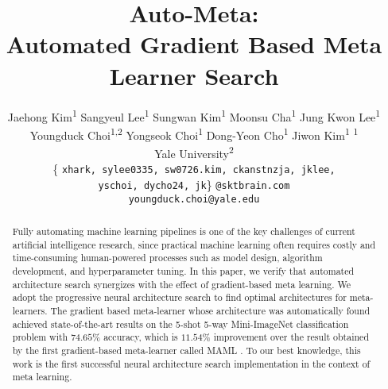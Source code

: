 \documentclass{article}
\title{Auto-Meta: \\
Automated Gradient Based Meta Learner Search}
\author{
  Jaehong Kim\textsuperscript{1}
  \And
  Sangyeul Lee\textsuperscript{1}
  \And
  Sungwan Kim\textsuperscript{1}
  \And
  Moonsu Cha\textsuperscript{1}
  \And
  Jung Kwon Lee\textsuperscript{1}
  \AND
  Youngduck Choi\textsuperscript{1,2}
  \And
  Yongseok Choi\textsuperscript{1}
  \And
  Dong-Yeon Cho\textsuperscript{1}
  \And
  Jiwon Kim\textsuperscript{1} 
  \AND
  \normalfont{SK T-Brain}\textsuperscript{1} \\
  Yale University\textsuperscript{2} \\
  \{ \texttt{xhark, sylee0335, sw0726.kim, ckanstnzja, jklee,} \\ 
  \texttt{yschoi, dycho24, jk}\} \texttt{@sktbrain.com} \\
  \texttt{youngduck.choi@yale.edu}
}
\begin{document}

\maketitle
\begin{abstract}
Fully automating machine learning pipelines is one of the key challenges of current artificial intelligence research, since practical machine learning often requires costly and time-consuming human-powered processes such as model design, algorithm development, and hyperparameter tuning. In this paper, we verify that automated architecture search synergizes with the effect of gradient-based meta learning. We adopt the progressive neural architecture search \cite{liu:pnas_google:DBLP:journals/corr/abs-1712-00559} to find optimal architectures for meta-learners. 
The gradient based meta-learner whose architecture was automatically found achieved state-of-the-art results on the 5-shot 5-way Mini-ImageNet classification problem with $74.65\%$ accuracy, which is $11.54\%$ improvement over the result obtained by the first gradient-based meta-learner called MAML \cite{finn:maml:DBLP:conf/icml/FinnAL17}.
To our best knowledge, this work is the first successful neural architecture search implementation in the context of meta learning.
 \end{abstract}
\end{document}
